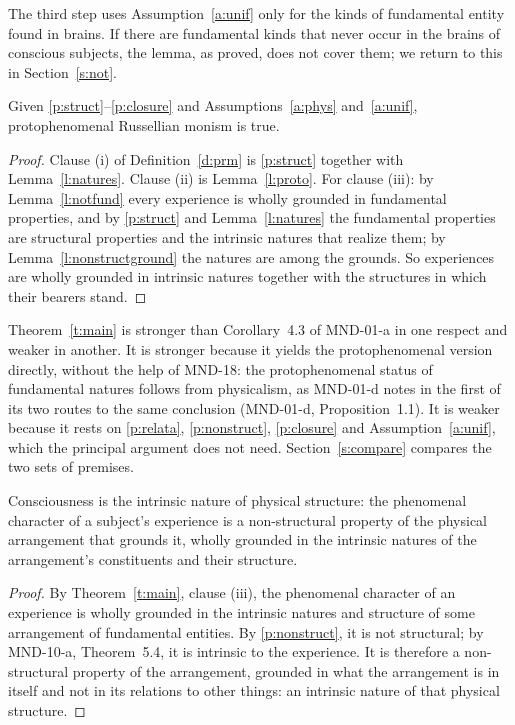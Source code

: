 \documentclass{situationist-preprint}
\begin{document}
The third step uses Assumption~\ref{a:unif} only for the kinds of fundamental entity found in brains. If there are fundamental kinds that never occur in the brains of conscious subjects, the lemma, as proved, does not cover them; we return to this in Section~\ref{s:not}.

\begin{theorem}\label{t:main}
Given \ref{p:struct}--\ref{p:closure} and Assumptions~\ref{a:phys} and~\ref{a:unif}, protophenomenal Russellian monism is true.
\end{theorem}

\begin{proof}
Clause (i) of Definition~\ref{d:prm} is \ref{p:struct} together with Lemma~\ref{l:natures}. Clause (ii) is Lemma~\ref{l:proto}. For clause (iii): by Lemma~\ref{l:notfund} every experience is wholly grounded in fundamental properties, and by \ref{p:struct} and Lemma~\ref{l:natures} the fundamental properties are structural properties and the intrinsic natures that realize them; by Lemma~\ref{l:nonstructground} the natures are among the grounds. So experiences are wholly grounded in intrinsic natures together with the structures in which their bearers stand.
\end{proof}

Theorem~\ref{t:main} is stronger than Corollary~4.3 of MND-01-a in one respect and weaker in another. It is stronger because it yields the protophenomenal version directly, without the help of MND-18: the protophenomenal status of fundamental natures follows from physicalism, as MND-01-d notes in the first of its two routes to the same conclusion (MND-01-d, Proposition~1.1). It is weaker because it rests on \ref{p:relata}, \ref{p:nonstruct}, \ref{p:closure} and Assumption~\ref{a:unif}, which the principal argument does not need. Section~\ref{s:compare} compares the two sets of premises.

\begin{corollary}\label{c:intrinsic}
Consciousness is the intrinsic nature of physical structure: the phenomenal character of a subject's experience is a non-structural property of the physical arrangement that grounds it, wholly grounded in the intrinsic natures of the arrangement's constituents and their structure.
\end{corollary}

\begin{proof}
By Theorem~\ref{t:main}, clause (iii), the phenomenal character of an experience is wholly grounded in the intrinsic natures and structure of some arrangement of fundamental entities. By \ref{p:nonstruct}, it is not structural; by MND-10-a, Theorem~5.4, it is intrinsic to the experience. It is therefore a non-structural property of the arrangement, grounded in what the arrangement is in itself and not in its relations to other things: an intrinsic nature of that physical structure.
\end{proof}
\end{document}

